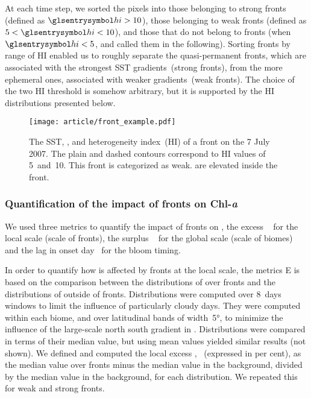 At each time step, we sorted the pixels into those belonging to strong fronts (defined as \(\am{hi} > 10\)), those belonging to weak fronts (defined as \(5 < \am{hi} < 10\)), and those that do not belong to fronts (when \(\am{hi} < 5\), and called them  in the following).
Sorting fronts by range of HI enabled us to roughly separate the quasi-permanent fronts, which are associated with the strongest SST gradients~(strong fronts), from the more ephemeral ones, associated with weaker gradients~(weak fronts).
The choice of the two HI threshold is somehow arbitrary, but it is supported by the HI distributions presented below.


\begin{figure}
  \centering
  \texttt{[image: article/front\_example.pdf]}
  \caption[Example of front]{
    The SST, , and heterogeneity index~(HI) of a front on the 7 July 2007.
    The plain and dashed contours correspond to HI values of 5~and~10.
    This front is categorized as weak.
     are elevated inside the front.
  }%
  \label{fig:zoom}
\end{figure}

\subsubsection{Quantification of the impact of fronts on Chl-\textit{a}}

We used three metrics to quantify the impact of fronts on , the excess ~ for the local scale (scale of fronts), the surplus ~ for the global scale (scale of biomes) and the lag in onset day~ for the bloom timing.

In order to quantify how  is affected by fronts at the local scale, the metrics E is based on the comparison between the distributions of  over fronts and the distributions of  outside of fronts.
Distributions were computed over 8~days windows to limit the influence of particularly cloudy days.
They were computed within each biome, and over latitudinal bands of width~\ang{5}, to minimize the influence of the large-scale north south gradient in .
Distributions were compared in terms of their median value, but using mean values yielded similar results (not shown).
We defined and computed the local excess ,~ (expressed in per cent), as the median value over fronts minus the median value in the background, divided by the median value in the background, for each distribution.
We repeated this for weak and strong fronts.


